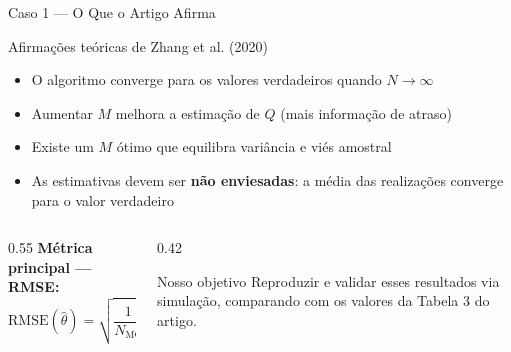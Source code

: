 \documentclass[aspectratio=169]{beamer}
\begin{document}
\begin{frame}{Caso 1 — O Que o Artigo Afirma}
    \begin{block}{Afirmações teóricas de Zhang et al. (2020)}
        \begin{itemize}
            \item O algoritmo converge para os valores verdadeiros quando $N \to \infty$
            \item Aumentar $M$ melhora a estimação de $Q$ (mais informação de atraso)
            \item Existe um $M$ ótimo que equilibra variância e viés amostral
            \item As estimativas devem ser \textbf{não enviesadas}: a média das
                  realizações converge para o valor verdadeiro
        \end{itemize}
    \end{block}
    \vspace{0.2cm}
    \begin{columns}[T]
        \begin{column}{0.55\textwidth}
            \textbf{Métrica principal — RMSE:}
            \[
                \text{RMSE}(\hat{\theta}) =
                \sqrt{\frac{1}{N_{\text{MC}}}\sum_{i=1}^{N_{\text{MC}}}
                \!\left(\hat{\theta}^{(i)} - \theta_{\text{true}}\right)^2}
            \]
        \end{column}
        \begin{column}{0.42\textwidth}
            \begin{alertblock}{Nosso objetivo}
                Reproduzir e validar esses resultados
                via simulação, comparando com os
                valores da Tabela 3 do artigo.
            \end{alertblock}
        \end{column}
    \end{columns}
\end{frame}
\end{document}
